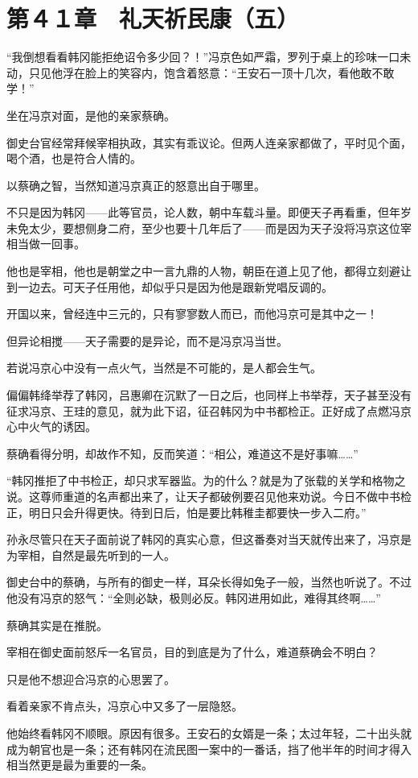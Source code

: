 \section{第４１章　礼天祈民康（五）}

“我倒想看看韩冈能拒绝诏令多少回？！”冯京色如严霜，罗列于桌上的珍味一口未动，只见他浮在脸上的笑容内，饱含着怒意：“王安石一顶十几次，看他敢不敢学！”

坐在冯京对面，是他的亲家蔡确。

御史台官经常拜候宰相执政，其实有乖议论。但两人连亲家都做了，平时见个面，喝个酒，也是符合人情的。

以蔡确之智，当然知道冯京真正的怒意出自于哪里。

不只是因为韩冈——此等官员，论人数，朝中车载斗量。即便天子再看重，但年岁未免太少，要想侧身二府，至少也要十几年后了——而是因为天子没将冯京这位宰相当做一回事。

他也是宰相，他也是朝堂之中一言九鼎的人物，朝臣在道上见了他，都得立刻避让到一边去。可天子任用他，却似乎只是因为他是跟新党唱反调的。

开国以来，曾经连中三元的，只有寥寥数人而已，而他冯京可是其中之一！

但异论相搅——天子需要的是异论，而不是冯京冯当世。

若说冯京心中没有一点火气，当然是不可能的，是人都会生气。

偏偏韩绛举荐了韩冈，吕惠卿在沉默了一日之后，也同样上书举荐，天子甚至没有征求冯京、王珪的意见，就为此下诏，征召韩冈为中书都检正。正好成了点燃冯京心中火气的诱因。

蔡确看得分明，却故作不知，反而笑道：“相公，难道这不是好事嘛……”

“韩冈推拒了中书检正，却只求军器监。为的什么？就是为了张载的关学和格物之说。这尊师重道的名声都出来了，让天子都破例要召见他来劝说。今日不做中书检正，明日只会升得更快。待到日后，怕是要比韩稚圭都要快一步入二府。”

孙永尽管只在天子面前说了韩冈的真实心意，但这番奏对当天就传出来了，冯京是为宰相，自然是最先听到的一人。

御史台中的蔡确，与所有的御史一样，耳朵长得如兔子一般，当然也听说了。不过他没有冯京的怒气：“全则必缺，极则必反。韩冈进用如此，难得其终啊……”

蔡确其实是在推脱。

宰相在御史面前怒斥一名官员，目的到底是为了什么，难道蔡确会不明白？

只是他不想迎合冯京的心思罢了。

看着亲家不肯点头，冯京心中又多了一层隐怒。

他始终看韩冈不顺眼。原因有很多。王安石的女婿是一条；太过年轻，二十出头就成为朝官也是一条；还有韩冈在流民图一案中的一番话，挡了他半年的时间才得入相当然更是最为重要的一条。

